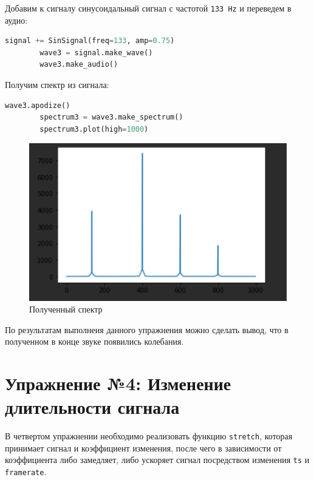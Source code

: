 \documentclass[a4]{article}
\begin{document}
    Добавим к сигналу синусоидальный сигнал с частотой \texttt{133 Hz} и переведем в аудио:

    \begin{lstlisting}[language=Python, caption= Получение спектра, label={lst:add_sin_133}]
        signal += SinSignal(freq=133, amp=0.75)
        wave3 = signal.make_wave()
        wave3.make_audio()
    \end{lstlisting}

    Получим спектр из сигнала:

    \begin{lstlisting}[language=Python, caption= Полученый спектр, label={lst:spectr_133}]
        wave3.apodize()
        spectrum3 = wave3.make_spectrum()
        spectrum3.plot(high=1000)
    \end{lstlisting}

    \begin{figure}[H]
        \centering
        \includegraphics[width=\textwidth]{spectr_133}
        \caption{Полученный спектр}
        \label{fig:spectr_133}
    \end{figure}

    По результатам выполнеия данного упражнения можно сделать вывод, что в полученном в конце звуке появились колебания.

    \newpage


    \section{Упражнение №4: Изменение длительности сигнала}
    \label{sec:4_stretch}
    В четвертом упражнении необходимо реализовать функцию \texttt{stretch}, которая принимает сигнал и коэффициент изменения, после чего в зависимости от коэффициента либо замедляет, либо ускоряет сигнал посредством изменения \texttt{ts} и \texttt{framerate}.
\end{document}
